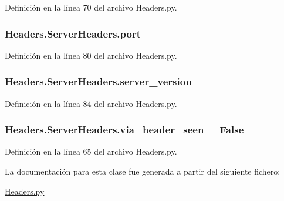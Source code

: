 Definición en la línea 70 del archivo Headers.\-py.

\hypertarget{class_headers_1_1_server_headers_a65d328b83a9f2484d81cfff78c887a87}{
\subsubsection[{port}]{\setlength{\rightskip}{0pt plus 5cm}Headers.\-Server\-Headers.\-port}}\label{class_headers_1_1_server_headers_a65d328b83a9f2484d81cfff78c887a87}


Definición en la línea 80 del archivo Headers.\-py.

\hypertarget{class_headers_1_1_server_headers_a53a6310df6c7b3c19966b47313a6bdf4}{
\subsubsection[{server\-\_\-version}]{\setlength{\rightskip}{0pt plus 5cm}Headers.\-Server\-Headers.\-server\-\_\-version}}\label{class_headers_1_1_server_headers_a53a6310df6c7b3c19966b47313a6bdf4}


Definición en la línea 84 del archivo Headers.\-py.

\hypertarget{class_headers_1_1_server_headers_a3ab7ddb505c5b674985f18ee4ebac340}{
\subsubsection[{via\-\_\-header\-\_\-seen}]{\setlength{\rightskip}{0pt plus 5cm}Headers.\-Server\-Headers.\-via\-\_\-header\-\_\-seen = False\hspace{0.3cm}{\ttfamily [static]}}}\label{class_headers_1_1_server_headers_a3ab7ddb505c5b674985f18ee4ebac340}


Definición en la línea 65 del archivo Headers.\-py.



La documentación para esta clase fue generada a partir del siguiente fichero\-:\begin{DoxyCompactItemize}
\item 
\hyperlink{_headers_8py}{Headers.\-py}\end{DoxyCompactItemize}
